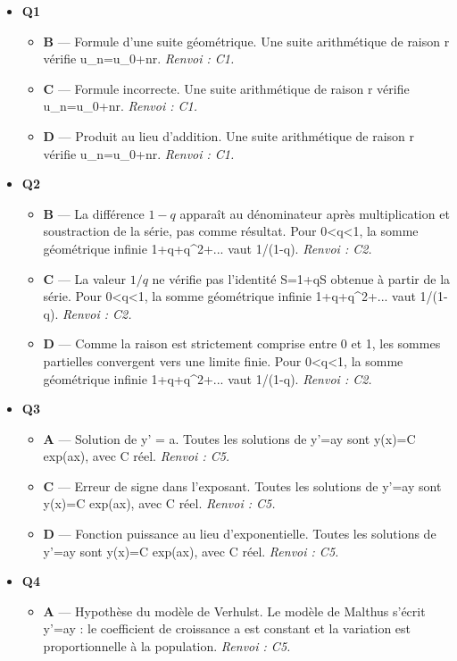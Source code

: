 \begin{itemize}
  \item \textbf{Q1}
  \begin{itemize}
    \item \textbf{B} — Formule d'une suite géométrique. Une suite arithmétique de raison r vérifie u\_n=u\_0+nr. \emph{Renvoi : C1.}
    \item \textbf{C} — Formule incorrecte. Une suite arithmétique de raison r vérifie u\_n=u\_0+nr. \emph{Renvoi : C1.}
    \item \textbf{D} — Produit au lieu d'addition. Une suite arithmétique de raison r vérifie u\_n=u\_0+nr. \emph{Renvoi : C1.}
  \end{itemize}
  \item \textbf{Q2}
  \begin{itemize}
    \item \textbf{B} — La différence $1-q$ apparaît au dénominateur après multiplication et soustraction de la série, pas comme résultat. Pour 0<q<1, la somme géométrique infinie 1+q+q\textasciicircum{}2+... vaut 1/(1-q). \emph{Renvoi : C2.}
    \item \textbf{C} — La valeur $1/q$ ne vérifie pas l'identité S=1+qS obtenue à partir de la série. Pour 0<q<1, la somme géométrique infinie 1+q+q\textasciicircum{}2+... vaut 1/(1-q). \emph{Renvoi : C2.}
    \item \textbf{D} — Comme la raison est strictement comprise entre 0 et 1, les sommes partielles convergent vers une limite finie. Pour 0<q<1, la somme géométrique infinie 1+q+q\textasciicircum{}2+... vaut 1/(1-q). \emph{Renvoi : C2.}
  \end{itemize}
  \item \textbf{Q3}
  \begin{itemize}
    \item \textbf{A} — Solution de y' = a. Toutes les solutions de y'=ay sont y(x)=C exp(ax), avec C réel. \emph{Renvoi : C5.}
    \item \textbf{C} — Erreur de signe dans l'exposant. Toutes les solutions de y'=ay sont y(x)=C exp(ax), avec C réel. \emph{Renvoi : C5.}
    \item \textbf{D} — Fonction puissance au lieu d'exponentielle. Toutes les solutions de y'=ay sont y(x)=C exp(ax), avec C réel. \emph{Renvoi : C5.}
  \end{itemize}
  \item \textbf{Q4}
  \begin{itemize}
    \item \textbf{A} — Hypothèse du modèle de Verhulst. Le modèle de Malthus s'écrit y'=ay : le coefficient de croissance a est constant et la variation est proportionnelle à la population. \emph{Renvoi : C5.}

\end{itemize}
\end{itemize}

